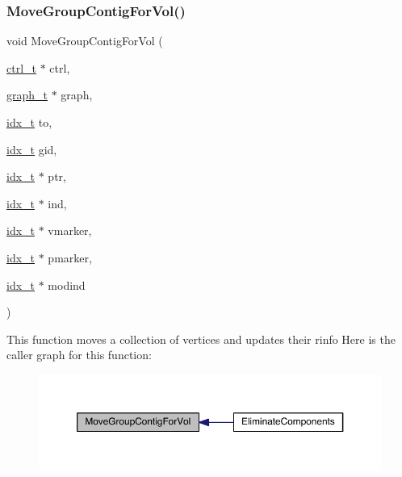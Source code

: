 \subsubsection{\texorpdfstring{Move\+Group\+Contig\+For\+Vol()}{MoveGroupContigForVol()}}
{\footnotesize\ttfamily void Move\+Group\+Contig\+For\+Vol (\begin{DoxyParamCaption}\item[{\hyperlink{a00742}{ctrl\+\_\+t} $\ast$}]{ctrl,  }\item[{\hyperlink{a00734}{graph\+\_\+t} $\ast$}]{graph,  }\item[{\hyperlink{a00876_aaa5262be3e700770163401acb0150f52}{idx\+\_\+t}}]{to,  }\item[{\hyperlink{a00876_aaa5262be3e700770163401acb0150f52}{idx\+\_\+t}}]{gid,  }\item[{\hyperlink{a00876_aaa5262be3e700770163401acb0150f52}{idx\+\_\+t} $\ast$}]{ptr,  }\item[{\hyperlink{a00876_aaa5262be3e700770163401acb0150f52}{idx\+\_\+t} $\ast$}]{ind,  }\item[{\hyperlink{a00876_aaa5262be3e700770163401acb0150f52}{idx\+\_\+t} $\ast$}]{vmarker,  }\item[{\hyperlink{a00876_aaa5262be3e700770163401acb0150f52}{idx\+\_\+t} $\ast$}]{pmarker,  }\item[{\hyperlink{a00876_aaa5262be3e700770163401acb0150f52}{idx\+\_\+t} $\ast$}]{modind }\end{DoxyParamCaption})}

This function moves a collection of vertices and updates their rinfo Here is the caller graph for this function\+:\nopagebreak
\begin{figure}[H]
\begin{center}
\leavevmode
\includegraphics[width=350pt]{a00188_ac9671fbb0e67a5e8bee0d578ebcd0382_icgraph}
\end{center}
\end{figure}
